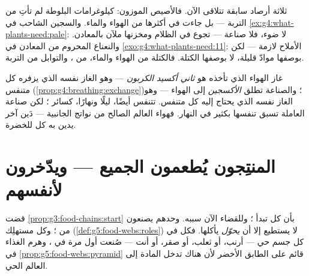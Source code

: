 \begin{example}\label{ex:g6:plants-are-producers:evidence}
ثلاثة أرصاد سابقة تتلاقى الآن. فالأصيص الموزون: كيلوغرامات
البلوطة لم تأتِ من التربة --- بل جاءت في أكثرها من الهواء والماء.
والسجين الشاحب في \cref{ex:g4:what-plants-need:pale}: لا ضوء، فلا
صناعة ---  تجوع في الظلام ومخزنها ملآن بالمعادن. والنعناع
المحروم من المعادن في \cref{exo:g4:what-plants-need:11}: الأملاح
لازمة --- لكن بوصفها موادّ قليلة، لا بوصفها الكتلة. فالكتلة من
الهواء والماء،  من ، والتوابل من التربة.
\end{example}

\begin{remark}\label{rem:g6:plants-are-producers:gas}
غاز الهواء الذي تأخذه  هو \emph{ثاني أكسيد الكربون} ---
وهو الغاز نفسه الذي يزفره كل متنفس
(\cref{prop:g4:breathing:exchange})؛ والصناعة تطلق
\emph{الأكسجين} إلى الهواء --- وهو الغاز نفسه الذي يحتاج إليه كل
متنفس.  تتنفس أيضًا، ليلًا ونهارًا، كسائر ؛
لكن صناعة  العاملة تسبق تنفسها بكثير في النهار. فهواء العالم
الصالح  من نواتج  الجانبية --- دَين آخر يدين به كل
 للخضرة.
\end{remark}

\section{المنتِجون يُطعمون الجميع --- ويدّخرون لأنفسهم}

\begin{proposition}\label{prop:g6:plants-are-producers:firstlink}
قضت \cref{prop:g3:food-chains:start} بأن كل  تبدأ
؛ وللقضاء الآن سببه.  وحدهم يصنعون  من
؛ وكل مستهلِك (\cref{def:g5:food-webs:roles}) لا يستطيع
إلا أن \emph{يحوّل}  يأكلها. فكل  في كل جسم حي
--- أرنب، أو ثعلب، أو صقر، أو أنت --- صُنعت أول مرة في ، وهرم
الغذاء في \cref{prop:g5:food-webs:pyramid} قائم على الطابق الأخضر
لأن هناك تدخل المادة إلى العالم الحي.
\end{proposition}
\admitted

